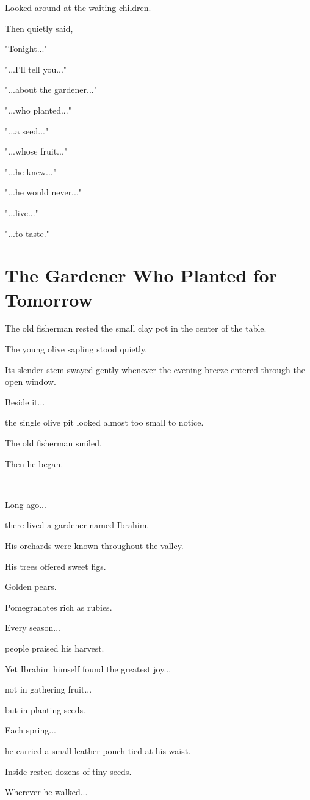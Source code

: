 \documentclass[12pt,openany]{book}
\begin{document}
Looked around at the waiting children.

Then quietly said,

"Tonight..."

"...I'll tell you..."

"...about the gardener..."

"...who planted..."

"...a seed..."

"...whose fruit..."

"...he knew..."

"...he would never..."

"...live..."

"...to taste."
\section*{The Gardener Who Planted for Tomorrow}

The old fisherman rested the small clay pot in the center of the table.

The young olive sapling stood quietly.

Its slender stem swayed gently whenever the evening breeze entered through the open window.

Beside it...

the single olive pit looked almost too small to notice.

The old fisherman smiled.

Then he began.

---

Long ago...

there lived a gardener named Ibrahim.

His orchards were known throughout the valley.

His trees offered sweet figs.

Golden pears.

Pomegranates rich as rubies.

Every season...

people praised his harvest.

Yet Ibrahim himself found the greatest joy...

not in gathering fruit...

but in planting seeds.

Each spring...

he carried a small leather pouch tied at his waist.

Inside rested dozens of tiny seeds.

Wherever he walked...
\end{document}
